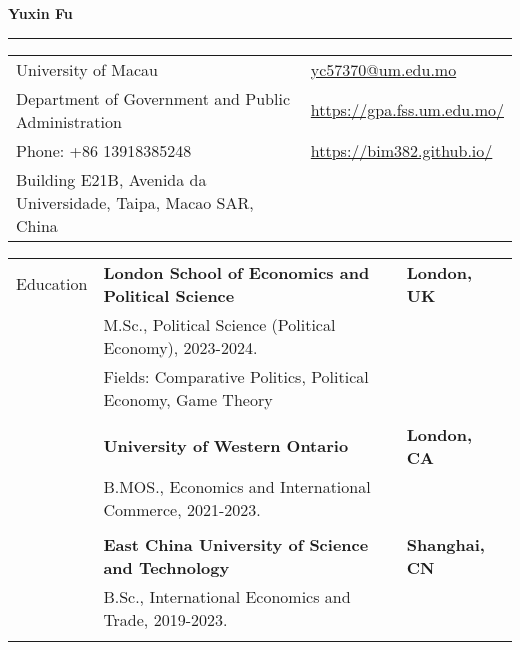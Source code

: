 \documentclass[letterpaper,11pt,oneside]{article}
\begin{document}

\noindent  \LARGE{\textbf{Yuxin Fu}} \\
\vspace{-2ex} 
\hrule 
\normalsize


\begin{center}
\begin{tabular}{l l}
 University of Macau    & \hspace{0.2in} \href{mailto:yc57370@um.edu.mo}{yc57370@um.edu.mo} \\
 Department of Government and Public Administration    & \hspace{0.2in}  \href{https://gpa.fss.um.edu.mo/}{https://gpa.fss.um.edu.mo/}   \\
 Phone: +86 13918385248  & \hspace{0.2in}  \href{https://bim382.github.io/}{https://bim382.github.io/}   \\
 Building E21B, Avenida da Universidade, Taipa, Macao SAR, China &    \\
\end{tabular}
\end{center}

\vspace{1em}


\noindent \begin{tabular}{l@{\hspace{0.4in}} l@{\hspace{0.1in}} l}
 \Large{Education}    & \textbf{London School of Economics and Political Science} & \textbf{London, UK}\\
     & M.Sc., Political Science (Political Economy), 2023-2024. \\
     & Fields: Comparative Politics, Political Economy, Game Theory \\
     & \\
     & \textbf{University of Western Ontario} & \textbf{London, CA}\\
     & B.MOS., Economics and International Commerce, 2021-2023. \\
     & \\
     & \textbf{East China University of Science and Technology} & \textbf{Shanghai, CN}\\
     & B.Sc., International Economics and Trade, 2019-2023. \\
     & \\
\end{tabular}
\end{document}
